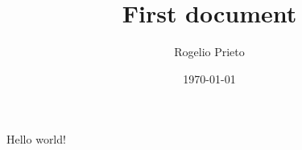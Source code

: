 \documentclass{article}
\title{First document}
\author{Rogelio Prieto}
\date{\today}
\begin{document}
   \maketitle
   Hello world!
\end{document}
